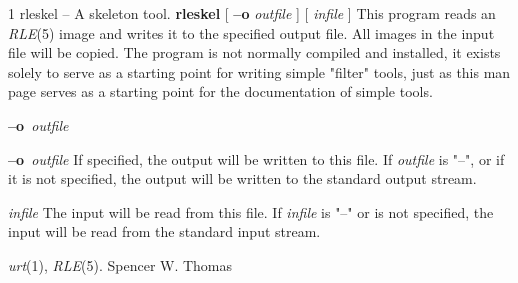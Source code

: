 %
%
%
 1
rleskel -- A skeleton tool.
{\bf rleskel}
[
{\bf --o}
{\it outfile}
] [ 
{\it infile}
]
This program reads an
{\it RLE}{\rm (5)}
image and writes it to the specified output file.  All images in
the input file will be copied.  The program is not normally compiled
and installed, it exists solely to serve as a starting point for
writing simple "filter" tools, just as this man page serves as a starting
point for the documentation of simple tools.
\begin{TPlist}{{\bf --o}{\it \ outfile}
}
\item[{{\bf --o}{\it \ outfile}
}]
If specified, the output will be written to this file.  If 
{\it outfile}
is "--", or if it is not specified, the output will be written to the
standard output stream.
\item[{{\it infile}}]
The input will be read from this file.  If
{\it infile}
is "--" or is not specified, the input will be read from the standard
input stream.
\end{TPlist}
{\it urt}{\rm (1),}
{\it RLE}{\rm (5).}
Spencer W. Thomas
\newpage



